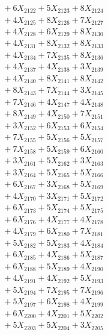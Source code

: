 \documentclass[a4paper,10pt]{article}
\begin{document}
{\begin{align}
&\;  + 6 X_{2122} + 5 X_{2123} + 8 X_{2124} \\[0.3ex]
&\;  + 4 X_{2125} + 8 X_{2126} + 7 X_{2127} \\[0.3ex]
&\;  + 4 X_{2128} + 6 X_{2129} + 8 X_{2130} \\[0.3ex]
&\;  + 4 X_{2131} + 8 X_{2132} + 8 X_{2133} \\[0.3ex]
&\;  + 4 X_{2134} + 7 X_{2135} + 8 X_{2136} \\[0.3ex]
&\;  + 4 X_{2137} + 4 X_{2138} + 3 X_{2139} \\[0.5ex]\allowbreak
&\;  + 4 X_{2140} + 8 X_{2141} + 8 X_{2142} \\[0.3ex]
&\;  + 8 X_{2143} + 7 X_{2144} + 3 X_{2145} \\[0.3ex]
&\;  + 7 X_{2146} + 4 X_{2147} + 4 X_{2148} \\[0.3ex]
&\;  + 8 X_{2149} + 4 X_{2150} + 7 X_{2151} \\[0.3ex]
&\;  + 3 X_{2152} + 6 X_{2153} + 6 X_{2154} \\[0.3ex]
&\;  + 7 X_{2155} + 5 X_{2156} + 5 X_{2157} \\[0.3ex]
&\;  + 7 X_{2158} + 5 X_{2159} + 6 X_{2160} \\[0.3ex]
&\;  + 3 X_{2161} + 5 X_{2162} + 3 X_{2163} \\[0.3ex]
&\;  + 3 X_{2164} + 5 X_{2165} + 5 X_{2166} \\[0.3ex]
&\;  + 6 X_{2167} + 3 X_{2168} + 5 X_{2169} \\[0.5ex]\allowbreak
&\;  + 4 X_{2170} + 3 X_{2171} + 5 X_{2172} \\[0.3ex]
&\;  + 6 X_{2173} + 5 X_{2174} + 5 X_{2175} \\[0.3ex]
&\;  + 6 X_{2176} + 4 X_{2177} + 4 X_{2178} \\[0.3ex]
&\;  + 4 X_{2179} + 6 X_{2180} + 7 X_{2181} \\[0.3ex]
&\;  + 5 X_{2182} + 5 X_{2183} + 4 X_{2184} \\[0.3ex]
&\;  + 6 X_{2185} + 4 X_{2186} + 5 X_{2187} \\[0.3ex]
&\;  + 6 X_{2188} + 5 X_{2189} + 4 X_{2190} \\[0.3ex]
&\;  + 4 X_{2191} + 4 X_{2192} + 5 X_{2193} \\[0.3ex]
&\;  + 5 X_{2194} + 7 X_{2195} + 7 X_{2196} \\[0.3ex]
&\;  + 5 X_{2197} + 6 X_{2198} + 4 X_{2199} \\[0.5ex]\allowbreak
&\;  + 6 X_{2200} + 4 X_{2201} + 5 X_{2202} \\[0.3ex]
&\;  + 5 X_{2203} + 5 X_{2204} + 3 X_{2205} \\[0.3ex]

\end{align}}
\end{document}
